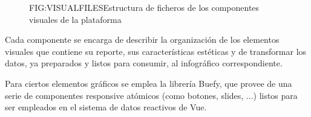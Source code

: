 \begin{figure}[Estructura de ficheros]{FIG:VISUALFILES}{Estructura de ficheros de los componentes visuales de la plataforma}
\end{figure}

Cada componente se encarga de describir la organización de los elementos visuales que contiene su reporte, sus características estéticas y de transformar los datos, ya preparados y listos para consumir, al infográfico correspondiente.

Para ciertos elementos gráficos se emplea la librería Buefy, que provee de una serie de componentes responsive atómicos (como botones, slides, ...) listos para ser empleados en el sistema de datos reactivos de Vue\cite{Buefy}.
